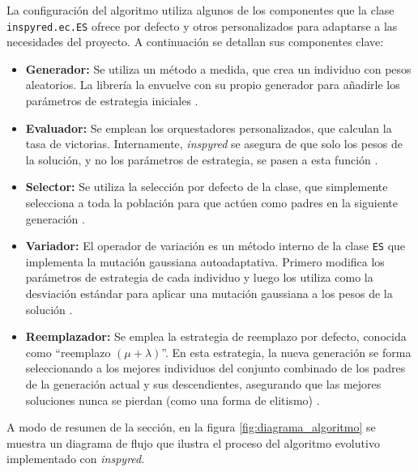 La configuración del algoritmo utiliza algunos de los componentes que la clase \texttt{inspyred.ec.ES} ofrece por defecto y otros personalizados para adaptarse a las necesidades del proyecto. A continuación se detallan sus componentes clave:
\begin{itemize}
	\item \textbf{Generador:} Se utiliza un método a medida, que crea un individuo con pesos aleatorios. La librería la envuelve con su propio generador para añadirle los parámetros de estrategia iniciales \cite{aaron_garret_library_2025}.
	\item \textbf{Evaluador:} Se emplean los orquestadores personalizados, que calculan la tasa de victorias. Internamente, \textit{inspyred} se asegura de que solo los pesos de la solución, y no los parámetros de estrategia, se pasen a esta función \cite{aaron_garret_library_2025}.
	\item \textbf{Selector:} Se utiliza la selección por defecto de la clase, que simplemente selecciona a toda la población para que actúen como padres en la siguiente generación \cite{aaron_garret_library_2025}.
	\item \textbf{Variador:} El operador de variación es un método interno de la clase \texttt{ES} que implementa la mutación gaussiana autoadaptativa. Primero modifica los parámetros de estrategia de cada individuo y luego los utiliza como la desviación estándar para aplicar una mutación gaussiana a los pesos de la solución \cite{aaron_garret_library_2025}.
	\item \textbf{Reemplazador:} Se emplea la estrategia de reemplazo por defecto, conocida como ``reemplazo $(\mu + \lambda)$''. En esta estrategia, la nueva generación se forma seleccionando a los mejores individuos del conjunto combinado de los padres de la generación actual y sus descendientes, asegurando que las mejores soluciones nunca se pierdan (como una forma de elitismo) \cite{aaron_garret_library_2025}.
\end{itemize}

A modo de resumen de la sección, en la figura \ref{fig:diagrama_algoritmo} se muestra un diagrama de flujo que ilustra el proceso del algoritmo evolutivo implementado con \textit{inspyred}.

